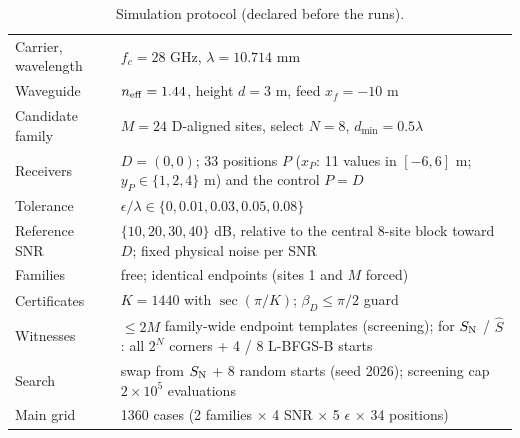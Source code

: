 \begin{table}[t]
\centering
\caption{Simulation protocol (declared before the runs).}
\label{tab:protocol}
\footnotesize
\begin{tabular}{@{}p{}p{}@{}}
\toprule
Carrier, wavelength & $f_c = 28$ GHz, $\lambda = 10.714$ mm \\
Waveguide & $n_{\rm eff} = 1.44$, height $d = 3$ m, feed $x_f = -10$ m \\
Candidate family & $M = 24$ D-aligned sites, select $N = 8$, $d_{\min} = 0.5\lambda$ \\
Receivers & $D = (0,0)$; 33 positions $P$ ($x_P$: 11 values in $[-6, 6]$ m; $y_P \in \{1,2,4\}$ m) and the control $P = D$ \\
Tolerance & $\epsilon/\lambda \in \{0, 0.01, 0.03, 0.05, 0.08\}$ \\
Reference SNR & $\{10, 20, 30, 40\}$ dB, relative to the central 8-site block toward $D$; fixed physical noise per SNR \\
Families & free; identical endpoints (sites 1 and $M$ forced) \\
Certificates & $K = 1440$ with $\sec(\pi/K)$; $\beta_D \le \pi/2$ guard \\
Witnesses & $\le 2M$ family-wide endpoint templates (screening); for $S_{\rm N}$ / $\hat S$: all $2^N$ corners + 4 / 8 L-BFGS-B starts \\
Search & swap from $S_{\rm N}$ + 8 random starts (seed 2026); screening cap $2\times10^{5}$ evaluations \\
Main grid & 1360 cases (2 families $\times$ 4 SNR $\times$ 5 $\epsilon$ $\times$ 34 positions) \\
\bottomrule
\end{tabular}
\end{table}
